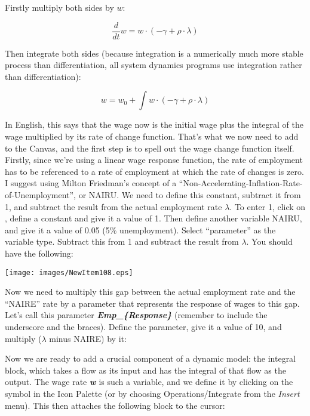 Firstly multiply both sides by $w$:

\begin{displaymath}
\frac d{dt}w = w\cdot(-\gamma+\rho\cdot\lambda)
\end{displaymath}

Then integrate both sides (because integration is a numerically much
more stable process than differentiation, all system dynamics programs
use integration rather than differentiation): 

\begin{displaymath}
w=w_0+\int w\cdot(-\gamma+\rho\cdot\lambda)
\end{displaymath}

In English, this says that the wage now is the initial wage plus the
integral of the wage multiplied by its rate of change function. That's
what we now need to add to the Canvas, and the first step is to spell
out the wage change function itself. Firstly, since we're using a
linear wage response function, the rate of employment has to be
referenced to a rate of employment at which the rate of changes is
zero.  I suggest using Milton Friedman's concept of a
``Non-Accelerating-Inflation-Rate-of-Unemployment'', or NAIRU. We need
to define this constant, subtract it from 1, and subtract the result
from the actual employment rate $\lambda$. To enter 1, click on
, define a constant and give it
a value of 1. Then define another variable NAIRU, and give it a value
of 0.05 (5\% unemployment). Select ``parameter'' as the variable
type. Subtract this from 1 and subtract the result from $\lambda$. You
should have the following:

\begin{center}
  \texttt{[image: images/NewItem108.eps]}
\end{center}

Now we need to multiply this gap between the actual employment rate
and the ``NAIRE'' rate by a parameter that represents the response of
wages to this gap. Let's call this parameter {\bf\em Emp\_\{Response\}} (remember to include the underscore and the braces). Define the parameter, give it a value of 10, and multiply ($\lambda$ minus NAIRE) by it:

\begin{center}
\end{center}

Now we are ready to add a crucial component of a dynamic model: the
integral block, which takes a flow as its input and has the integral
of that flow as the output. The wage rate {\bf\em w} is such a variable, and we
define it by clicking on the  symbol in the Icon Palette (or by
choosing Operations/Integrate from the {\em Insert} menu). This then attaches the
following block to the cursor: 

